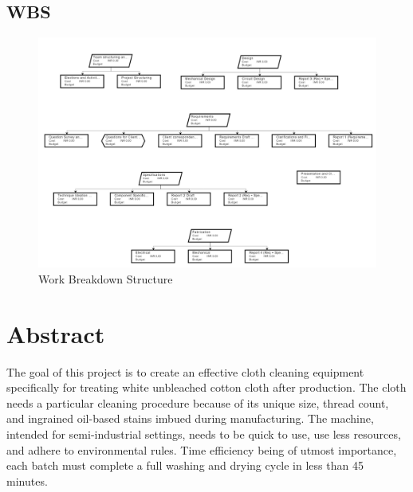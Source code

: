 \documentclass[12pt]{article}
\begin{document}
\subsection{WBS}
\begin{center}
    \begin{figure}[H]
        \centering
        \includegraphics[width=1.1\linewidth]{Images/WBS_1.jpg}
        \caption{Work Breakdown Structure}
        \label{fig:wbs}
    \end{figure}
\end{center}
\section{Abstract}
The goal of this project is to create an effective cloth cleaning equipment specifically for treating white unbleached cotton cloth after production. The cloth needs a particular cleaning procedure because of its unique size, thread count, and ingrained oil-based stains imbued during manufacturing. The machine, intended for semi-industrial settings, needs to be quick to use, use less resources, and adhere to environmental rules. Time efficiency being of utmost importance, each batch must complete a full washing and drying cycle in less than 45 minutes.
\end{document}
